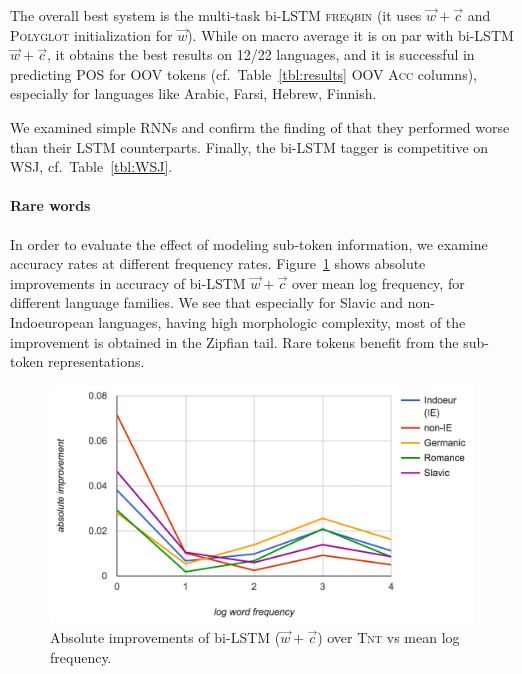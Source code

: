 \documentclass[11pt]{article}
\begin{document}
The overall best system is the multi-task bi-LSTM \textsc{freqbin} (it uses ${\vec{w}+\vec{c}}$ and \textsc{Polyglot} initialization for $\vec{w}$). 
While on macro average it is on par with bi-LSTM ${\vec{w}+\vec{c}}$, it obtains the best results on 12/22 languages, and it is successful in predicting POS for OOV tokens 
(cf.\ Table~\ref{tbl:results} \textsc{OOV Acc} columns), especially for languages like Arabic, Farsi, Hebrew, Finnish. 

We examined simple RNNs and confirm the finding of   that they performed worse than their LSTM counterparts. 
Finally, the bi-LSTM tagger is competitive on WSJ, cf.\ Table~\ref{tbl:WSJ}. %

\paragraph{Rare words} In order to evaluate the effect of modeling sub-token information, we examine accuracy rates at different frequency rates. 
Figure~\ref{fig:logfreq} shows absolute improvements in accuracy of bi-LSTM $\vec{w}+\vec{c}$ over mean log frequency, for different language families. We see that especially for Slavic and non-Indoeuropean languages, having high morphologic complexity, most of the improvement is obtained in the Zipfian tail. Rare tokens benefit from the sub-token representations.

\begin{figure}[h!]
\includegraphics[width=\columnwidth]{logfreqaccuracy.png}
\caption{Absolute improvements of bi-LSTM ($\vec{w}+\vec{c}$) over \textsc{Tnt} vs mean log frequency.}
\label{fig:logfreq}
\end{figure}
\end{document}
